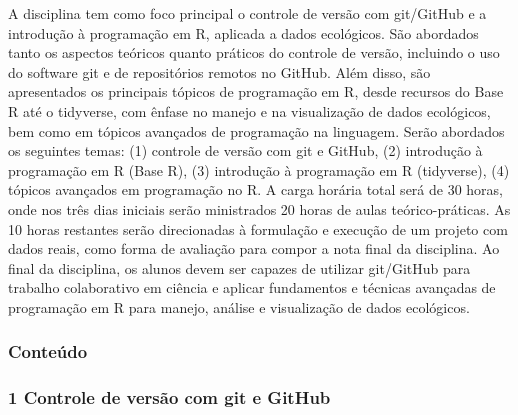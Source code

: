 \documentclass[
  letterpaper,
  DIV=11,
  numbers=noendperiod]{scrartcl}
\begin{document}
A disciplina tem como foco principal o controle de versão com git/GitHub
e a introdução à programação em R, aplicada a dados ecológicos. São
abordados tanto os aspectos teóricos quanto práticos do controle de
versão, incluindo o uso do software git e de repositórios remotos no
GitHub. Além disso, são apresentados os principais tópicos de
programação em R, desde recursos do Base R até o tidyverse, com ênfase
no manejo e na visualização de dados ecológicos, bem como em tópicos
avançados de programação na linguagem. Serão abordados os seguintes
temas: (1) controle de versão com git e GitHub, (2) introdução à
programação em R (Base R), (3) introdução à programação em R
(tidyverse), (4) tópicos avançados em programação no R. A carga horária
total será de 30 horas, onde nos três dias iniciais serão ministrados 20
horas de aulas teórico-práticas. As 10 horas restantes serão
direcionadas à formulação e execução de um projeto com dados reais, como
forma de avaliação para compor a nota final da disciplina. Ao final da
disciplina, os alunos devem ser capazes de utilizar git/GitHub para
trabalho colaborativo em ciência e aplicar fundamentos e técnicas
avançadas de programação em R para manejo, análise e visualização de
dados ecológicos.

\subsubsection{Conteúdo}\label{conteuxfado}

\subsubsection{1 Controle de versão com git e
GitHub}\label{controle-de-versuxe3o-com-git-e-github}
\end{document}
